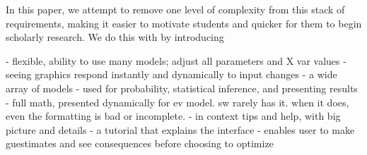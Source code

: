 \documentclass[12pt]{article}
\theoremstyle{definition}
\begin{document}
In this paper, we attempt to remove one level of complexity from this stack of requirements, making it easier to motivate students and quicker for them to begin scholarly research.  We do this with by introducing


- flexible, ability to use many models; adjust all parameters and X var values
- seeing graphics respond instantly and dynamically to input changes
- a wide array of models
- used for probability, statistical inference, and presenting results
- full math, presented dynamically for ev model.  sw rarely has it. when it does, even the formatting is bad or incomplete.
- in context tips and help, with big picture and details
- a tutorial that explains the interface
- enables user to make guestimates and see consequences before choosing to optimize




\singlespace
\printbibliography
\end{document}
